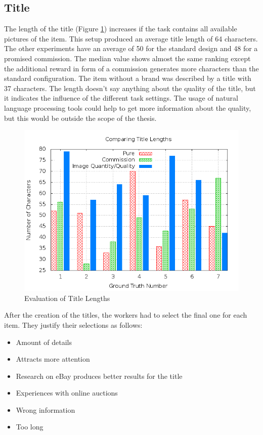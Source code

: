 \subsection{Title}
The length of the title (Figure \ref{crowdsourcing_title_length}) increases if the task contains all available pictures of the item. This setup produced an average title length of 64 characters. The other experiments have an average of 50 for the standard design and 48 for a promised commission. The median value shows almost the same ranking except the additional reward in form of a commission generates more characters than the standard configuration. The item without a brand was described by a title with 37 characters. The length doesn't say anything about the quality of the title, but it indicates the influence of the different task settings. The usage of natural language processing tools could help to get more information about the quality, but this would be outside the scope of the thesis.
\begin{figure}
\centering
\includegraphics[scale=0.55]{images/plots/crowdsourcing/plot_title_length.png}
\caption{Evaluation of Title Lengths}
\label{crowdsourcing_title_length}
\end{figure} 

After the creation of the titles, the workers had to select the final one for each item. They justify their selections as follows:
\begin{itemize}
	\item Amount of details 
	\item Attracts more attention 
	\item Research on eBay produces better results for the title 
	\item Experiences with online auctions 
	\item Wrong information 
	\item Too long 
\end{itemize}

